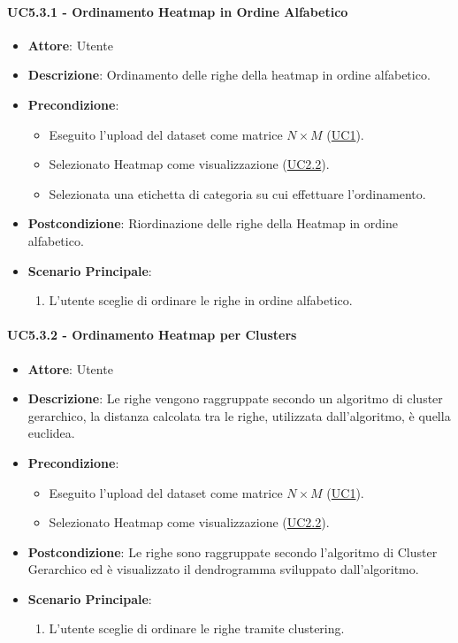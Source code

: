     \paragraph{UC5.3.1 - Ordinamento Heatmap in Ordine Alfabetico}
    \label{uc5.3.1}
    \begin{itemize}
    \item \textbf{Attore}: Utente
    \item \textbf{Descrizione}: Ordinamento delle righe della heatmap in ordine alfabetico.
    \item \textbf{Precondizione}: 
    \begin{itemize}
        \item Eseguito l'upload del dataset come matrice $N\times M$ (\hyperref[uc1]{UC1}).
        \item Selezionato Heatmap come visualizzazione (\hyperref[uc2.2]{UC2.2}).
        \item Selezionata una etichetta di categoria su cui effettuare l'ordinamento.
    \end{itemize}  
    \item \textbf{Postcondizione}: Riordinazione delle righe della Heatmap in ordine alfabetico.
    \item \textbf{Scenario Principale}: 
    \begin{enumerate}
        \item L'utente sceglie di ordinare le righe in ordine alfabetico.
    \end{enumerate}  
    \end{itemize}
    
    \paragraph{UC5.3.2 - Ordinamento Heatmap per Clusters}
    \label{uc5.3.2}
    \begin{itemize}
    \item \textbf{Attore}: Utente
    \item \textbf{Descrizione}: Le righe vengono raggruppate secondo un algoritmo di cluster gerarchico, la distanza calcolata  tra le righe, utilizzata dall'algoritmo, è quella euclidea.
    \item \textbf{Precondizione}: 
    \begin{itemize}
        \item Eseguito l'upload del dataset come matrice $N\times M$ (\hyperref[uc1]{UC1}).
        \item Selezionato Heatmap come visualizzazione (\hyperref[uc2.2]{UC2.2}).
    \end{itemize}  
    \item \textbf{Postcondizione}: Le righe sono raggruppate secondo l'algoritmo di Cluster Gerarchico ed è visualizzato il dendrogramma sviluppato dall'algoritmo.
    \item \textbf{Scenario Principale}: 
    \begin{enumerate}
        \item L'utente sceglie di ordinare le righe tramite clustering.
    \end{enumerate}  
    \end{itemize}
    
